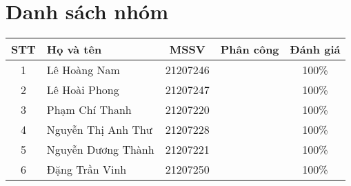 %
\chapter*{Danh sách nhóm}
\label{ch::danhsach}
\begin{table}[h]
\centering
\large
\begin{tabular}{|c|l|c|l|c|}
\hline
\textbf{STT} & \textbf{Họ và tên} & \textbf{MSSV} & \textbf{Phân công} & \textbf{Đánh giá} \\ \hline
1 & Lê Hoàng Nam & 21207246 &  & 100\% \\ \hline
2 & Lê Hoài Phong & 21207247 &  & 100\% \\ \hline
3 & Phạm Chí Thanh & 21207220 &  & 100\% \\ \hline
4 & Nguyễn Thị Anh Thư & 21207228 &  & 100\% \\ \hline
5 & Nguyễn Dương Thành & 21207221 &  & 100\% \\ \hline
6 & Đặng Trần Vinh & 21207250 &  & 100\% \\ \hline
\end{tabular}
\end{table}
